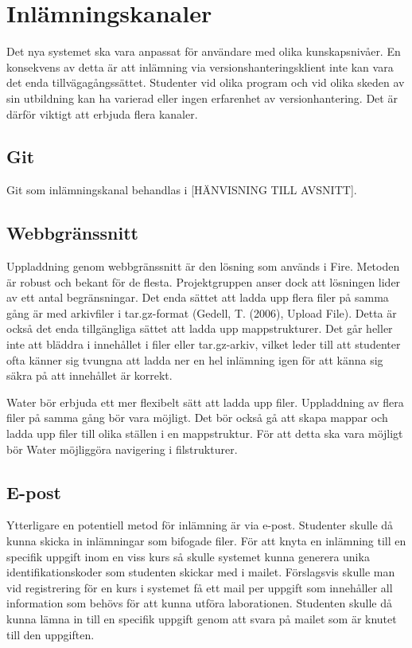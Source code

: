 \section{Inlämningskanaler}

Det nya systemet ska vara anpassat för användare med olika kunskapsnivåer. En konsekvens av detta är att inlämning via versionshanteringsklient inte kan vara det enda tillvägagångssättet. Studenter vid olika program och vid olika skeden av sin utbildning kan ha varierad eller ingen erfarenhet av versionhantering. Det är därför viktigt att erbjuda flera kanaler.

\subsection{Git}
Git som inlämningskanal behandlas i  [HÄNVISNING TILL AVSNITT].

\subsection{Webbgränssnitt}
Uppladdning genom webbgränssnitt är den lösning som används i Fire. Metoden är robust och bekant för de flesta. Projektgruppen anser dock att lösningen lider av ett antal begränsningar. Det enda sättet att ladda upp flera filer på samma gång är med arkivfiler i tar.gz-format (Gedell, T. (2006), Upload File). Detta är också det enda tillgängliga sättet att ladda upp mappstrukturer. Det går heller inte att bläddra i innehållet i filer eller tar.gz-arkiv, vilket leder till att studenter ofta känner sig tvungna att ladda ner en hel inlämning igen för att känna sig säkra på att innehållet är korrekt.

Water bör erbjuda ett mer flexibelt sätt att ladda upp filer. Uppladdning av flera filer på samma gång bör vara möjligt. Det bör också gå att skapa mappar och ladda upp filer till olika ställen i en mappstruktur. För att detta ska vara möjligt bör Water möjliggöra navigering i filstrukturer.

\subsection{E-post}
Ytterligare en potentiell metod för inlämning är via e-post. Studenter skulle då kunna skicka in inlämningar som bifogade filer. För att knyta en inlämning till en specifik uppgift inom en viss kurs så skulle systemet kunna generera unika identifikationskoder som studenten skickar med i mailet. Förslagsvis skulle man vid registrering för en kurs i systemet få ett mail per uppgift som innehåller all information som behövs för att kunna utföra laborationen. Studenten skulle då kunna lämna in till en specifik uppgift genom att svara på mailet som är knutet till den uppgiften.

